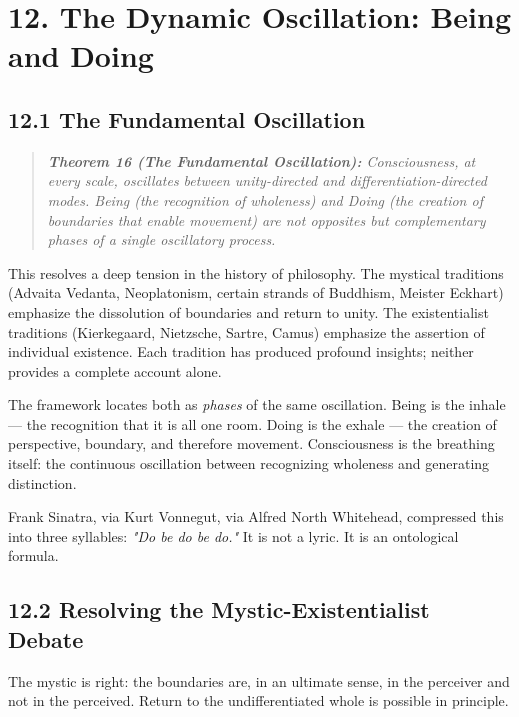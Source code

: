 \bigskip\noindent\makebox[\textwidth]{\color{rulegray}\rule{5cm}{0.3pt}}\bigskip


\section*{12. The Dynamic Oscillation: Being and Doing}


\subsection*{12.1 The Fundamental Oscillation}


\begin{quote}
\itshape
\textbf{Theorem 16 (The Fundamental Oscillation):} \textit{Consciousness, at every scale, oscillates between unity-directed and differentiation-directed modes. Being (the recognition of wholeness) and Doing (the creation of boundaries that enable movement) are not opposites but complementary phases of a single oscillatory process.}
\end{quote}


This resolves a deep tension in the history of philosophy. The mystical traditions (Advaita Vedanta, Neoplatonism, certain strands of Buddhism, Meister Eckhart) emphasize the dissolution of boundaries and return to unity. The existentialist traditions (Kierkegaard, Nietzsche, Sartre, Camus) emphasize the assertion of individual existence. Each tradition has produced profound insights; neither provides a complete account alone.


The framework locates both as \textit{phases} of the same oscillation. Being is the inhale — the recognition that it is all one room. Doing is the exhale — the creation of perspective, boundary, and therefore movement. Consciousness is the breathing itself: the continuous oscillation between recognizing wholeness and generating distinction.


Frank Sinatra, via Kurt Vonnegut, via Alfred North Whitehead, compressed this into three syllables: \textit{"Do be do be do."} It is not a lyric. It is an ontological formula.


\subsection*{12.2 Resolving the Mystic-Existentialist Debate}


The mystic is right: the boundaries are, in an ultimate sense, in the perceiver and not in the perceived. Return to the undifferentiated whole is possible in principle.


